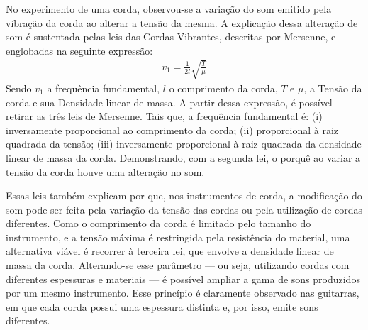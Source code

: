 No experimento de uma corda, observou-se a variação do som emitido pela vibração da corda ao alterar a tensão da mesma. A explicação dessa alteração de som é sustentada pelas leis das Cordas Vibrantes, descritas por Mersenne, e englobadas na seguinte expressão:
\begin{align*}
	v_1 = \frac{1}{2l} \sqrt{\frac{T}{\mu}}
\end{align*}
Sendo \(v_1\) a frequência fundamental, \(l\) o comprimento da corda, \(T\) e  \( \mu\), a Tensão da corda e sua Densidade linear de massa.
A partir dessa expressão, é possível retirar as três leis de Mersenne. Tais que, a frequência fundamental é: (i) inversamente proporcional ao comprimento da corda; (ii) proporcional à raiz quadrada da tensão; (iii) inversamente proporcional à raiz quadrada da densidade linear de massa da corda. Demonstrando, com a segunda lei, o porquê ao variar a tensão da corda houve uma alteração no som.

Essas leis também explicam por que, nos instrumentos de corda, a modificação do som pode ser feita pela variação da tensão das cordas ou pela utilização de cordas diferentes. Como o comprimento da corda é limitado pelo tamanho do instrumento, e a tensão máxima é restringida pela resistência do material, uma alternativa viável é recorrer à terceira lei, que envolve a densidade linear de massa da corda. Alterando-se esse parâmetro — ou seja, utilizando cordas com diferentes espessuras e materiais — é possível ampliar a gama de sons produzidos por um mesmo instrumento. Esse princípio é claramente observado nas guitarras, em que cada corda possui uma espessura distinta e, por isso, emite sons diferentes.
